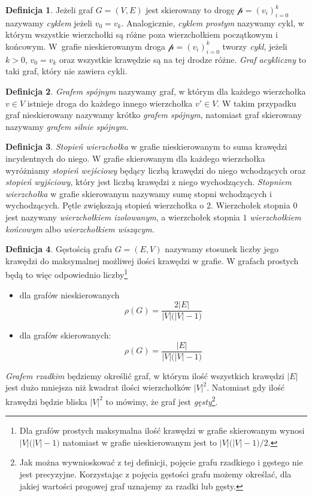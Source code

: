 \documentclass[12pt,a4paper]{book}
\theoremstyle{definition}
\newtheorem{de}{Definicja}[chapter]
\newcommand{\p}{{\mathcal p}}
\numberwithin{equation}{chapter}
\begin{document}
\begin{de}
Jeżeli graf $G = (V,E)$ jest skierowany to drogę $\p = (v_i)_{i=0}^{k}$ nazywamy \textit{cyklem} jeżeli $v_0 = v_k$. Analogicznie, \textit{cyklem prostym} nazywamy cykl, w którym wszystkie wierzchołki są różne poza wierzchołkiem początkowym i końcowym. W~grafie nieskierowanym droga $\p = (v_i)_{i=0}^{k}$ tworzy \textit{cykl}, jeżeli $k>0$,  $v_0 = v_k$ oraz wszystkie krawędzie są na tej drodze różne. \textit{Graf acykliczny} to taki graf, który nie zawiera cykli. 
\end{de}

\begin{de}
\textit{Grafem spójnym} nazywamy graf, w którym dla każdego wierzchołka $v \in V$ istnieje droga do każdego innego wierzchołka $v' \in V$. W takim przypadku graf nieskierowany nazywamy krótko \textit{grafem spójnym}, natomiast graf skierowany nazywamy \textit{grafem silnie spójnym}.
\end{de}
 
\begin{de}
\textit{Stopień wierzchołka} w grafie nieskierowanym to suma krawędzi incydentnych do niego. W grafie skierowanym dla każdego wierzchołka wyróżniamy \textit{stopień wejściowy} będący liczbą krawędzi do niego wchodzących oraz \textit{stopień wyjściowy}, który jest liczbą krawędzi z niego wychodzących. \textit{Stopniem wierzchołka} w grafie skierowanym nazywamy sumę stopni wchodzących i wychodzących. Pętle zwiększają stopień wierzchołka o $2$. Wierzchołek stopnia $0$ jest nazywany \textit{wierzchołkiem izolowanym}, a wierzchołek stopnia $1$ \textit{wierzchołkiem końcowym} albo \textit{wierzchołkiem wiszącym}.
\end{de}

\begin{de}
Gęstością grafu $G= (E,V)$ nazywamy stosunek liczby jego krawędzi do maksymalnej możliwej ilości krawędzi w grafie. W grafach prostych będą to więc odpowiednio liczby\footnote{Dla grafów prostych maksymalna ilość krawędzi w grafie skierowanym wynosi $|V|\big(|V|-1\big)$ natomiast w grafie nieskierowanym jest to $|V|\big(|V|-1\big)/2$.} 
\begin{itemize}
\item dla grafów nieskierowanych
$$
\rho(G) = \frac{2|E|}{|V|\big(|V|-1\big)}
$$
\item dla grafów skierowanych:
$$
\rho(G) = \frac{|E|}{|V|\big(|V|-1\big)}
$$
\end{itemize}

\textit{Grafem rzadkim} będziemy określić graf, w którym ilość wszystkich krawędzi $|E|$ jest dużo mniejsza niż kwadrat ilości wierzchołków $|V|^2$. Natomiast gdy ilość krawędzi będzie bliska $|V|^2$ to mówimy, że graf jest \textit{gęsty}\footnote{Jak można wywnioskować z tej definicji, pojęcie grafu rzadkiego i gęstego nie jest precyzyjne. Korzystając z pojęcia gęstości grafu możemy określać, dla jakiej wartości progowej graf uznajemy za rzadki lub gęsty.}.
\end{de}
\end{document}
